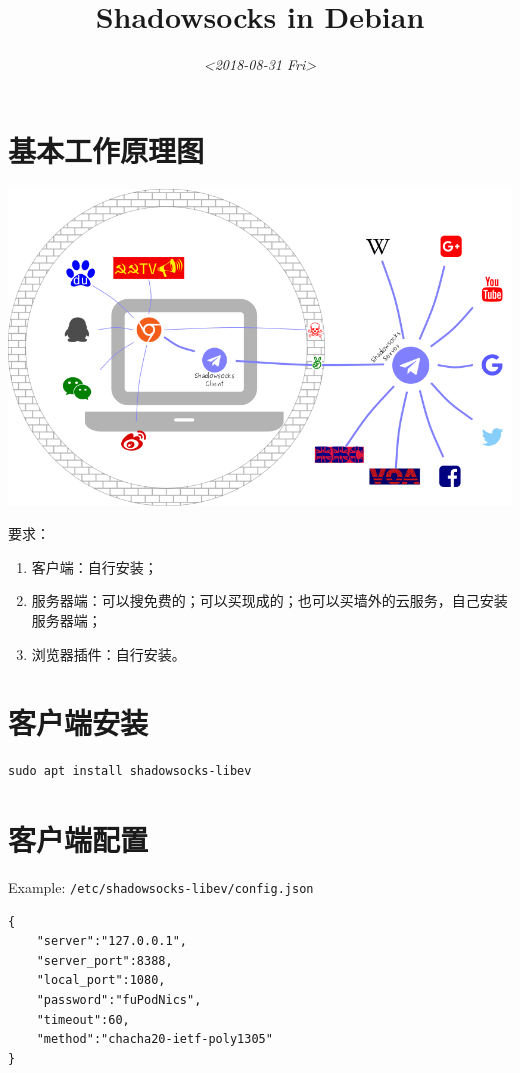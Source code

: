 \documentclass{wx672ctexart}
\date{\textit{<2018-08-31 Fri>}}
\title{Shadowsocks in Debian}
\begin{document}
\maketitle
\tableofcontents


\section{基本工作原理图}
\label{sec:orgafd07c7}
\begin{center}
\includegraphics[width=.6\linewidth]{./ss.png}
\end{center}

要求：
\begin{enumerate}
\item 客户端：自行安装；
\item 服务器端：可以搜免费的；可以买现成的；也可以买墙外的云服务，自己安装服务器端；
\item 浏览器插件：自行安装。
\end{enumerate}

\section{客户端安装}
\label{sec:org3dc84e3}
\begin{verbatim}
sudo apt install shadowsocks-libev
\end{verbatim}
\section{客户端配置}
\label{sec:org4311b55}
Example: \texttt{/etc/shadowsocks-libev/config.json}

\begin{verbatim}
{
    "server":"127.0.0.1",
    "server_port":8388,
    "local_port":1080,
    "password":"fuPodNics",
    "timeout":60,
    "method":"chacha20-ietf-poly1305"
}
\end{verbatim}
\end{document}
